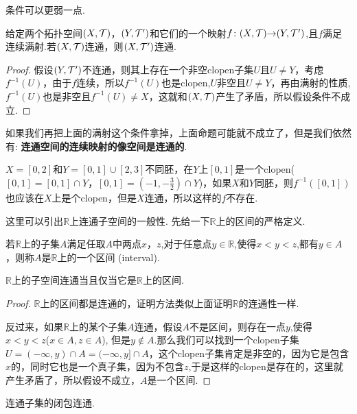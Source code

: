 条件可以更弱一点.

\begin{proposition}
给定两个拓扑空间$(X,\mathcal{T})$，$(Y,\mathcal{T}')$和它们的一个映射${f}\colon{(X,\mathcal{T})}{\to}{(Y,\mathcal{T}')}$,且$f$满足连续满射.若$(X,\mathcal{T})$连通，则$(X,\mathcal{T}')$连通.
\end{proposition}

\begin{proof}
\rm 假设$(Y,\mathcal{T}')$不连通，则其上存在一个非空clopen子集$U$且$U \neq Y$，考虑$f^{-1}(U)$，由于$f$连续，所以$f^{-1}(U)$也是clopen,$U$非空且$U \neq Y$，再由满射的性质,$f^{-1}(U)$也是非空且$f^{-1}(U) \neq X$，这就和$(X,\mathcal{T})$产生了矛盾，所以假设条件不成立.
\end{proof}

如果我们再把上面的满射这个条件拿掉，上面命题可能就不成立了，但是我们依然有: \textbf{连通空间的连续映射的像空间是连通的}.

\begin{example}
\rm $X=[0,2]$和$Y=[0,1] \cup [2,3]$不同胚，在$Y$上$[0,1]$是一个clopen($[0,1] = [0,1] \cap Y$，$[0,1] = (-1,-\frac{3}{2}) \cap Y$)，如果$X$和$Y$同胚，则$f^{-1}([0,1])$也应该在$X$上是个clopen，但是$X$连通，所以这样的$f$不存在.
\end{example}

这里可以引出$\mathbb{R}$上连通子空间的一般性. 先给一下$\mathbb{R}$上的区间的严格定义.

\begin{definition}
若$\mathbb{R}$上的子集$A$满足任取$A$中两点$x$，$z$,对于任意点$y \in \mathbb{R}$,使得$x < y < z$,都有$y \in A$，则称$A$是$\mathbb{R}$上的一个区间 \rm (interval).
\end{definition}

\begin{proposition}
$\mathbb{R}$上的子空间连通当且仅当它是$\mathbb{R}$上的区间.
\end{proposition}

\begin{proof}
$\mathbb{R}$上的区间都是连通的，证明方法类似上面证明$\mathbb{R}$的连通性一样.

\rm 反过来，如果$\mathbb{R}$上的某个子集$A$连通，假设$A$不是区间，则存在一点$y$,使得$x< y < z$($x \in A,z \in A$), 但是$y \notin A$.那么我们可以找到一个clopen子集$U = (-\infty,y) \cap A = (-\infty,y] \cap A $，这个clopen子集肯定是非空的，因为它是包含$x$的，同时它也是一个真子集，因为不包含$z$,于是这样的clopen是存在的，这里就产生矛盾了，所以假设不成立，$A$是一个区间.
\end{proof}


\begin{proposition}
连通子集的闭包连通.
\end{proposition}

